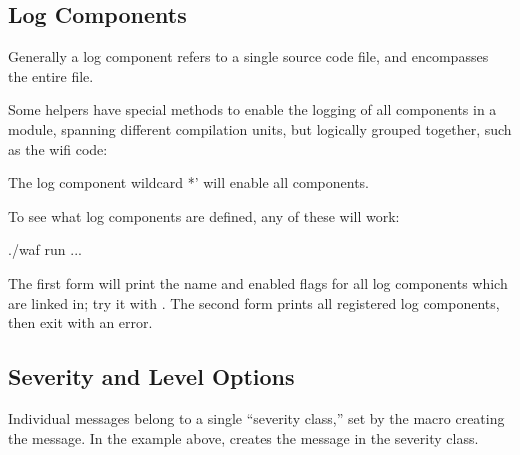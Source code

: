 \documentclass[letterpaper,10pt,english]{sphinxmanual}
\renewcommand{\sphinxcode}[1]{\texttt{\small{#1}}}
\begin{document}
\subsection{Log Components}
\label{\detokenize{logging:log-components}}
Generally a log component refers to a single source code \sphinxcode{} file,
and encompasses the entire file.

Some helpers have special methods to enable the logging of all components
in a module, spanning different compilation units, but logically grouped
together, such as the  wifi code:

\begin{sphinxVerbatim}[commandchars=\\\{\}]
 
 
\end{sphinxVerbatim}

The \sphinxcode{} log component wildcard \textasciigrave{}*’ will enable all components.

To see what log components are defined, any of these will work:

\begin{sphinxVerbatim}[commandchars=\\\{\}]
\PYGZdl{}  ./waf \PYGZhy{}\PYGZhy{}run ...

\PYGZdl{}   
\end{sphinxVerbatim}

The first form will print the name and enabled flags for all log components
which are linked in; try it with \sphinxcode{}.
The second form prints all registered log components,
then exit with an error.


\subsection{Severity and Level Options}
\label{\detokenize{logging:severity-and-level-options}}
Individual messages belong to a single “severity class,” set by the macro
creating the message.  In the example above,
\sphinxcode{} creates the message in the \sphinxcode{} severity class.
\end{document}
